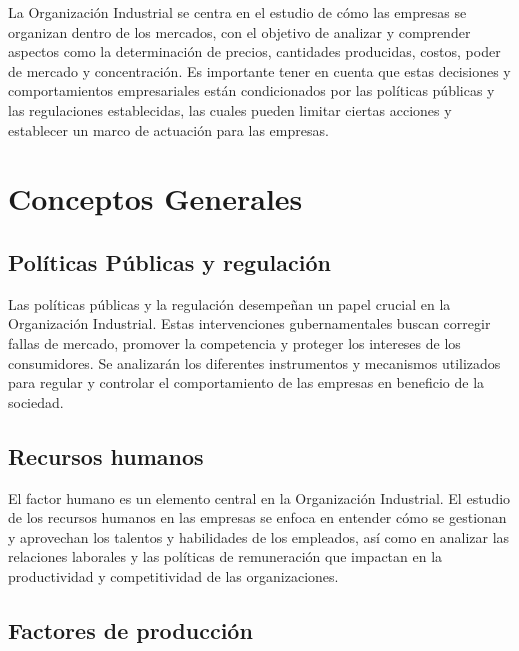 \documentclass[
  letterpaper,
  DIV=11,
  numbers=noendperiod]{scrartcl}
\begin{document}
La Organización Industrial se centra en el estudio de cómo las empresas
se organizan dentro de los mercados, con el objetivo de analizar y
comprender aspectos como la determinación de precios, cantidades
producidas, costos, poder de mercado y concentración. Es importante
tener en cuenta que estas decisiones y comportamientos empresariales
están condicionados por las políticas públicas y las regulaciones
establecidas, las cuales pueden limitar ciertas acciones y establecer un
marco de actuación para las empresas.

\hypertarget{conceptos-generales}{%
\section{Conceptos Generales}\label{conceptos-generales}}

\hypertarget{poluxedticas-puxfablicas-y-regulaciuxf3n}{%
\subsection{Políticas Públicas y
regulación}\label{poluxedticas-puxfablicas-y-regulaciuxf3n}}

Las políticas públicas y la regulación desempeñan un papel crucial en la
Organización Industrial. Estas intervenciones gubernamentales buscan
corregir fallas de mercado, promover la competencia y proteger los
intereses de los consumidores. Se analizarán los diferentes instrumentos
y mecanismos utilizados para regular y controlar el comportamiento de
las empresas en beneficio de la sociedad.

\hypertarget{recursos-humanos}{%
\subsection{Recursos humanos}\label{recursos-humanos}}

El factor humano es un elemento central en la Organización Industrial.
El estudio de los recursos humanos en las empresas se enfoca en entender
cómo se gestionan y aprovechan los talentos y habilidades de los
empleados, así como en analizar las relaciones laborales y las políticas
de remuneración que impactan en la productividad y competitividad de las
organizaciones.

\hypertarget{factores-de-producciuxf3n}{%
\subsection{Factores de producción}\label{factores-de-producciuxf3n}}
\end{document}
